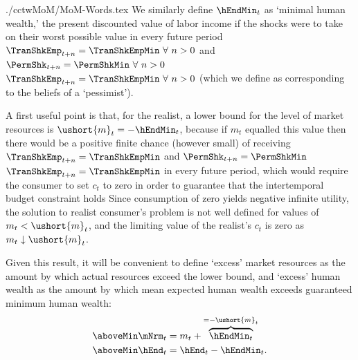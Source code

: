 \documentclass[titlepage, headings=optiontotocandhead]{\econtex}
\newcommand{\PermShkOn}{\ifthenelse{\boolean{PermShkVersion}}}
\begin{document}
\begin{verbatimwrite}{./cctwMoM/MoM-Words.tex}
  We similarly define $\hEndMin_{t}$ as `minimal human wealth,' the
  present discounted value of labor income if the shocks were to take on
  their worst possible value in every future period \PermShkOn
  {$\TranShkEmp_{t+n} = \TranShkEmpMin ~\forall~n>0$ and $\PermShk_{t+n} =
    \PermShkMin ~\forall~n>0$} {$\TranShkEmp_{t+n} = \TranShkEmpMin
    ~\forall~n>0$} (which we define as corresponding to the beliefs of a
  `pessimist').


  A first useful point is that, for the realist, a lower bound for the
  level of market resources is $\ushort{m}_{t} = -\hEndMin_{t}$, because
  if ${m}_{t}$ equalled this value then there would be a positive finite
  chance (however small) of receiving \PermShkOn
  {$\TranShkEmp_{t+n}=\TranShkEmpMin$ and $\PermShk_{t+n}=\PermShkMin$}
  {$\TranShkEmp_{t+n}=\TranShkEmpMin$}
  in
  every future period, which would require the consumer to set ${c}_{t}$
  to zero in order to guarantee that the intertemporal budget constraint
  holds  Since consumption of zero yields negative
  infinite utility, the solution to realist consumer's problem is not well
  defined for values of ${m}_{t} < \ushort{m}_{t}$, and the limiting
  value of the realist's ${c}_t$ is zero as ${m}_{t} \downarrow \ushort{m}_{t}$.

  Given this result, it will be convenient to define `excess' market
  resources as the amount by which actual resources exceed the lower
  bound, and `excess' human wealth as the amount by which mean expected human wealth
  exceeds guaranteed minimum human wealth:
  \begin{equation*}\begin{gathered}\begin{aligned}
        \aboveMin \mNrm_{t}  & = {m}_{t}+\overbrace{\hEndMin_{t}}^{=-\ushort{m}_{t}}
        \\  \aboveMin \hEnd_{t}  & = \hEnd_{t}-\hEndMin_{t}.
      \end{aligned}\end{gathered}\end{equation*}


\end{verbatimwrite}
\end{document}
